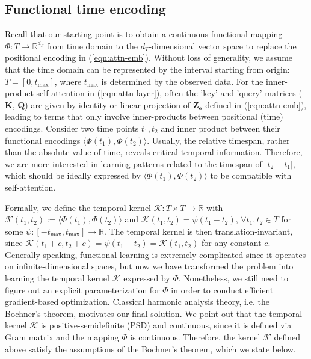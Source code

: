 \documentclass{article} %
\newcommand{\Zbf}{\mathbf{Z}}
\newcommand{\ebf}{\mathbf{e}}
\newcommand{\Qbf}{\mathbf{Q}}
\newcommand{\Kbf}{\mathbf{K}}
\newcommand{\Rbb}{\mathbb{R}}
\newcommand{\Kcal}{\mathcal{K}}
\begin{document}
\subsection{Functional time encoding}
\label{sec:functional}
Recall that our starting point is to obtain a continuous functional mapping $\Phi: T \to \Rbb^{d_T}$ from time domain to the $d_T$-dimensional vector space to replace the positional encoding in (\ref{eqn:attn-emb}). 
Without loss of generality, we assume that the time domain can be represented by the interval starting from origin: $T = [0, t_{\max}]$, where $t_{\max}$ is determined by the observed data. For the inner-product
self-attention in (\ref{eqn:attn-layer}), often the 'key' and 'query' matrices ($\Kbf$, $\Qbf$) are given by identity or linear projection of $\Zbf_{\ebf}$ defined in (\ref{eqn:attn-emb}), leading to terms that only involve inner-products between positional (time) encodings. Consider two time points $t_1, t_2$ and inner product between their functional encodings $\big\langle \Phi (t_1), \Phi (t_2) \big\rangle$. Usually, the relative timespan, rather than the absolute value of time, reveals critical temporal information. Therefore, we are more interested in learning patterns related to the timespan of $|t_2 - t_1|$, which should be ideally expressed by $\big\langle \Phi (t_1), \Phi (t_2) \big\rangle$ to be compatible with self-attention.


Formally, we define the temporal kernel $\Kcal: T \times T \to \Rbb$ with $\Kcal(t_1,t_2):= \big\langle \Phi (t_1), \Phi (t_2) \big\rangle$ and $\Kcal(t_1, t_2) = \psi(t_1-t_2)$, $\forall t_1,t_2 \in T$ for some $\psi: [-t_{\max}, t_{\max}] \to \Rbb$. The temporal kernel is then translation-invariant, since $\Kcal(t_1+c,t_2+c) = \psi(t_1-t_2) = \Kcal(t_1,t_2)$ for any constant $c$. Generally speaking, functional learning is extremely complicated since it operates on infinite-dimensional spaces, but now we have transformed the problem into learning the temporal kernel $\Kcal$ expressed by $\Phi$. Nonetheless, we still need to figure out an explicit parameterization for $\Phi$ in order to conduct efficient gradient-based optimization. Classical harmonic analysis theory, i.e. the Bochner's theorem, motivates our final solution. We point out that the temporal kernel $\Kcal$ is positive-semidefinite (PSD) and continuous, since it is defined via Gram matrix and the mapping $\Phi$ is continuous. Therefore, the kernel $\Kcal$ defined above satisfy the assumptions of the Bochner's theorem, which we state below.
\end{document}

